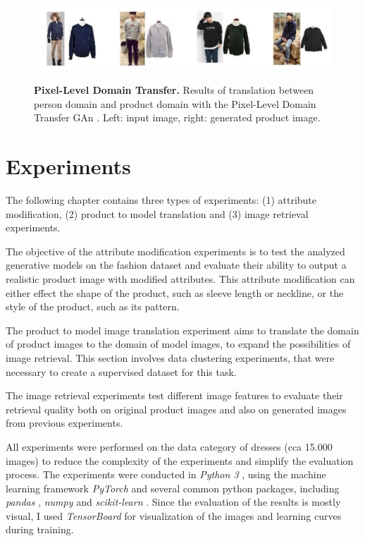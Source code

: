 \documentclass[12pt]{report}
\begin{document}
\begin{figure}[h]
\centering
{\includegraphics[width=\linewidth]{03_analysis/related/pixeldtgan}}
\caption{\label{fig:pixeldtgan} \textbf{Pixel-Level Domain Transfer.} Results of translation between person domain and product domain with the Pixel-Level Domain Transfer GAn \cite{yoo_pixel-level_2016}. Left: input image, right: generated product image.}
\end{figure}

\pagebreak
\chapter{Experiments}
The following chapter contains three types of experiments: (1) attribute modification, (2) product to model translation and (3) image retrieval experiments.

The objective of the attribute modification experiments is to test the analyzed generative models on the fashion dataset and evaluate their ability to output a realistic product image with modified attributes. This attribute modification can either effect the shape of the product, such as sleeve length or neckline, or the style of the product, such as its pattern.

The product to model image translation experiment aims to translate the domain of product images to the domain of model images, to expand the possibilities of image retrieval. This section involves data clustering experiments, that were necessary to create a supervised dataset for this task.

The image retrieval experiments test different image features to evaluate their retrieval quality both on original product images and also on generated images from previous experiments.

All experiments were performed on the data category of dresses (cca 15.000 images) to reduce the complexity of the experiments and simplify the evaluation process. The experiments were conducted in \textit{Python 3} \cite{noauthor_welcome_nodate}, using the machine learning framework \textit{PyTorch} \cite{noauthor_pytorch_nodate} and several common python packages, including \textit{pandas} \cite{noauthor_python_nodate}, \textit{numpy} \cite{noauthor_numpy_nodate} and \textit{scikit-learn} \cite{noauthor_scikit-learn_nodate}. Since the evaluation of the results is mostly visual, I used \textit{TensorBoard} \cite{noauthor_tensorflows_2018} for visualization of the images and learning curves during training.
\end{document}
